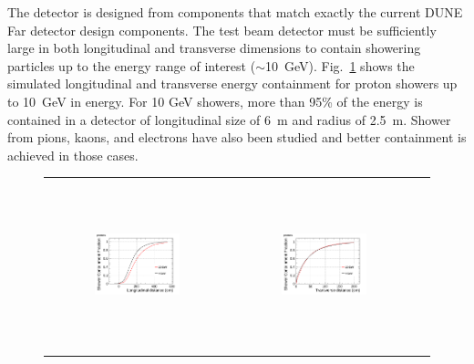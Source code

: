
The detector is designed from components that match exactly the current DUNE Far detector design components. 
The test beam detector must be sufficiently large in both
longitudinal and transverse dimensions to contain showering particles up to the energy range of interest ($\sim$10~GeV).
Fig.~\ref{fig:containment} shows the simulated longitudinal and transverse 
energy containment for proton showers up to 10~GeV in energy.
For 10 GeV showers, more than 95\% of the energy is contained in a detector of longitudinal size of 6~m and 
radius of 2.5~m. Shower from pions, kaons, and electrons have also been studied and better containment
is achieved in those cases. 
\begin{figure}[htp]
  \centering
  \label{fig:containment}  
  \begin{tabular}{ccc}
%  
   \includegraphics[width=0.49\textwidth,height=4.9cm]{figures/protons_lcont_overlay}&
   \includegraphics[width=0.49\textwidth,height=4.9cm]{figures/protons_wcont_overlay}\\
% 
 

\end{tabular}
\end{figure}
